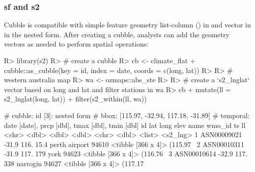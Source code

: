 \documentclass[
]{jss}
\begin{document}
\hypertarget{sf-and-s2}{%
\subsubsection{sf and s2}\label{sf-and-s2}}

Cubble is compatible with simple feature geometry list-column
() in  and  vector in  in the
nested form. After creating a cubble, analysts can add the geometry
vectors as needed to perform spatial operations:

\begin{CodeChunk}
\begin{CodeInput}
R> library(s2)
R> # create a cubble
R> cb <- climate_flat %
+   cubble::as_cubble(key = id, index = date, coords = c(long, lat))
R> 
R> # western australia map
R> wa <- ozmaps::abs_ste %
R> 
R> # create a `s2_lnglat` vector based on long and lat and filter stations in wa
R> cb %
+   mutate(ll = s2_lnglat(long, lat)) %
+   filter(s2_within(ll, wa))
\end{CodeInput}
\begin{CodeOutput}
# cubble:   id [3]: nested form
# bbox:     [115.97, -32.94, 117.18, -31.89]
# temporal: date [date], prcp [dbl], tmax [dbl], tmin [dbl]
  id            lat  long  elev name          wmo_id ts                 ll      
  <chr>       <dbl> <dbl> <dbl> <chr>          <dbl> <list>             <s2_lng>
1 ASN00009021 -31.9  116.  15.4 perth airport  94610 <tibble [366 x 4]> (115.97~
2 ASN00010311 -31.9  117. 179   york           94623 <tibble [366 x 4]> (116.76~
3 ASN00010614 -32.9  117. 338   narrogin       94627 <tibble [366 x 4]> (117.17~
\end{CodeOutput}
\end{CodeChunk}
\end{document}
